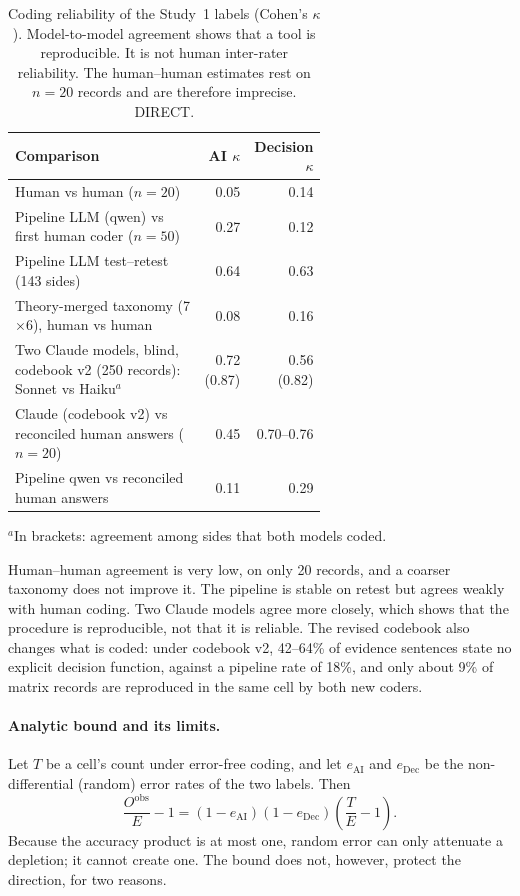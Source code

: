 \begin{table}[tbp]
  \centering
  \small
  \caption{Coding reliability of the Study~1 labels (Cohen's $\kappa$). Model-to-model agreement shows that a tool is reproducible. It is not human inter-rater reliability. The human--human estimates rest on $n = 20$ records and are therefore imprecise. DIRECT.}
  \label{tab:reliability}
  \begin{tabular}{p{0.62\linewidth}rr}
    \toprule
    Comparison & AI $\kappa$ & Decision $\kappa$ \\
    \midrule
    Human vs human ($n = 20$) & 0.05 & 0.14 \\
    Pipeline LLM (qwen) vs first human coder ($n = 50$) & 0.27 & 0.12 \\
    Pipeline LLM test--retest (143 sides) & 0.64 & 0.63 \\
    Theory-merged taxonomy (7$\times$6), human vs human & 0.08 & 0.16 \\
    Two Claude models, blind, codebook v2 (250 records): Sonnet vs Haiku$^{a}$ & 0.72 (0.87) & 0.56 (0.82) \\
    Claude (codebook v2) vs reconciled human answers ($n = 20$) & 0.45 & 0.70--0.76 \\
    Pipeline qwen vs reconciled human answers & 0.11 & 0.29 \\
    \bottomrule
  \end{tabular}

  \smallskip
  \raggedright\footnotesize $^{a}$In brackets: agreement among sides that both models coded.
\end{table}

Human--human agreement is very low, on only 20 records, and a coarser taxonomy does not improve it. The pipeline is stable on retest but agrees weakly with human coding. Two Claude models agree more closely, which shows that the procedure is reproducible, not that it is reliable. The revised codebook also changes what is coded: under codebook v2, 42--64\% of evidence sentences state no explicit decision function, against a pipeline rate of 18\%, and only about 9\% of matrix records are reproduced in the same cell by both new coders.

\paragraph{Analytic bound and its limits.} Let $T$ be a cell's count under error-free coding, and let $e_{\mathrm{AI}}$ and $e_{\mathrm{Dec}}$ be the non-differential (random) error rates of the two labels. Then
\begin{equation}
\frac{O^{\mathrm{obs}}}{E} - 1 = (1 - e_{\mathrm{AI}})(1 - e_{\mathrm{Dec}})\left(\frac{T}{E} - 1\right).
\label{eq:attenuation}
\end{equation}
Because the accuracy product is at most one, random error can only attenuate a depletion; it cannot create one. The bound does not, however, protect the direction, for two reasons.

